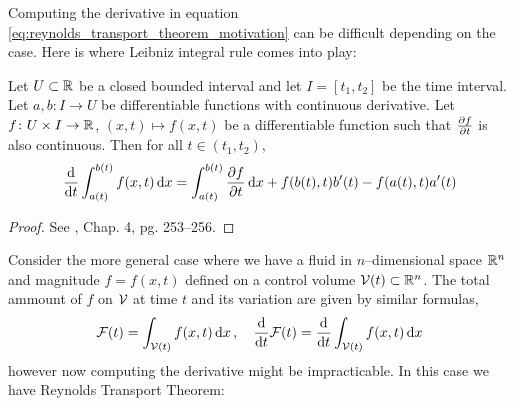 Computing the derivative in equation
\eqref{eq:reynolds_transport_theorem_motivation} can be difficult depending on
the case. Here is where Leibniz integral rule comes into play:

\begin{theorem}
	Let $U \subset \mathbb{R}$ be a closed bounded interval and let $I = [t_1, t_2]$
	be the time interval. Let $a, b \colon I \rightarrow U$ be differentiable
	functions with continuous derivative. Let $f \colon U \times I \rightarrow
	\mathbb{R}$, $(x,t) \mapsto f(x,t)$ be a differentiable function such that
	$\pdv{f}{t}$ is also continuous. Then for all $t \in (t_1, t_2)$,
	\begin{equation*}
		\frac{\dd}{\dd{t}} \int_{a(t)}^{b(t)} f(x,t) \dd{x} = 
		\int_{a(t)}^{b(t)} \pdv{f}{t}(x,t) \dd{x} + f(b(t),t) b'(t) - f(a(t),t) a'(t)
	\end{equation*}
\end{theorem}
\begin{proof}
	See \cite{kaplan2002advanced}, Chap. 4, pg. 253--256.
\end{proof}

\noindent
Consider the more general case where we have a fluid in $n$--dimensional space
$\mathbb{R}^n$ and magnitude $f = f(x,t)$ defined on a control volume ${\mathcal{V}(t)} \subset
\mathbb{R}^n$. The total ammount of $f$ on $\mathcal{V}_{}$ at time $t$ and its variation are given by similar formulas,
\begin{equation*}
	\mathcal{F}(t) = \int_{\mathcal{V}(t)} f(x,t) \dd{x}, \quad
	\frac{\dd}{\dd{t}} \mathcal{F}(t) = \frac{\dd}{\dd{t}} \int_{\mathcal{V}(t)} f(x,t) \dd{x}
\end{equation*}
however now computing the derivative might be impracticable. In this case we
have Reynolds Transport Theorem:

